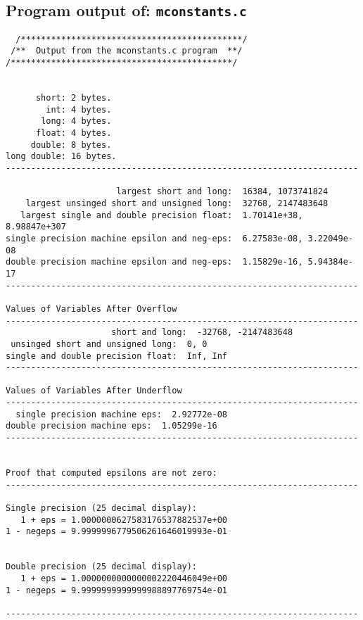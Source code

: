\documentclass{article}
\begin{document}
\subsection{Program output of: {\tt mconstants.c}}
\begin{verbatim}
  /********************************************/
 /**  Output from the mconstants.c program  **/
/********************************************/


      short: 2 bytes.
        int: 4 bytes.
       long: 4 bytes.
      float: 4 bytes.
     double: 8 bytes.
long double: 16 bytes.
----------------------------------------------------------------------

                      largest short and long:  16384, 1073741824
    largest unsinged short and unsigned long:  32768, 2147483648
   largest single and double precision float:  1.70141e+38, 8.98847e+307
single precision machine epsilon and neg-eps:  6.27583e-08, 3.22049e-08
double precision machine epsilon and neg-eps:  1.15829e-16, 5.94384e-17
----------------------------------------------------------------------

Values of Variables After Overflow
----------------------------------------------------------------------
                     short and long:  -32768, -2147483648
 unsinged short and unsigned long:  0, 0
single and double precision float:  Inf, Inf
----------------------------------------------------------------------

Values of Variables After Underflow
----------------------------------------------------------------------
  single precision machine eps:  2.92772e-08
double precision machine eps:  1.05299e-16
----------------------------------------------------------------------


Proof that computed epsilons are not zero:
----------------------------------------------------------------------

Single precision (25 decimal display):
   1 + eps = 1.0000000627583176537882537e+00
1 - negeps = 9.9999996779506261646019993e-01


Double precision (25 decimal display):
   1 + eps = 1.0000000000000002220446049e+00
1 - negeps = 9.9999999999999988897769754e-01

----------------------------------------------------------------------

\end{verbatim}
\end{document}
